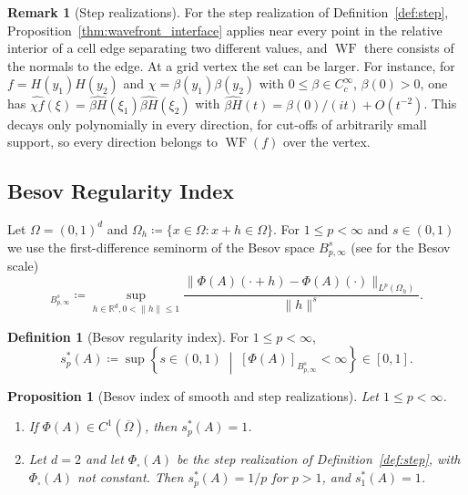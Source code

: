 \documentclass[11pt,a4paper,reqno]{amsart}
\newtheorem{proposition}[theorem]{Proposition}
\theoremstyle{definition}
\newtheorem{definition}[theorem]{Definition}
\newtheorem{remark}[theorem]{Remark}
\numberwithin{equation}{section}
\newcommand{\R}{\mathbb{R}}
\newcommand{\WF}{\operatorname{WF}}
\begin{document}
\begin{remark}[Step realizations]
For the step realization of Definition~\ref{def:step}, Proposition~\ref{thm:wavefront_interface} applies near every point in the relative interior of a cell edge separating two different values, and $\WF$ there consists of the normals to the edge. At a grid vertex the set can be larger. For instance, for $f = H(y_1)H(y_2)$ and $\chi = \beta(y_1)\beta(y_2)$ with $0 \le \beta \in C_c^\infty$, $\beta(0) > 0$, one has $\widehat{\chi f}(\xi) = \widehat{\beta H}(\xi_1)\widehat{\beta H}(\xi_2)$ with $\widehat{\beta H}(t) = \beta(0)/(it) + O(t^{-2})$. This decays only polynomially in every direction, for cut-offs of arbitrarily small support, so every direction belongs to $\WF(f)$ over the vertex.
\end{remark}

\subsection{Besov Regularity Index}
Let $\Omega = (0,1)^d$ and $\Omega_h \coloneqq \{x \in \Omega : x + h \in \Omega\}$. For $1 \le p < \infty$ and $s \in (0,1)$ we use the first-difference seminorm of the Besov space $B^s_{p,\infty}$ (see \cite{triebel1983theory} for the Besov scale)
\begin{equation}
    [\Phi(A)]_{B^s_{p,\infty}} \coloneqq \sup_{h \in \R^d, 0 < \|h\| \le 1} \frac{\|\Phi(A)(\cdot + h) - \Phi(A)(\cdot)\|_{L^p(\Omega_h)}}{\|h\|^s}.
\end{equation}

\begin{definition}[Besov regularity index]
For $1 \le p < \infty$,
\begin{equation}
    s^*_p(A) \coloneqq \sup \left\{ s \in (0, 1) \;\middle|\; [\Phi(A)]_{B^s_{p,\infty}} < \infty \right\} \in [0,1].
\end{equation}
\end{definition}

\begin{proposition}[Besov index of smooth and step realizations]
\label{prop:besov}
Let $1 \le p < \infty$.
\begin{enumerate}[label=(\alph*)]
    \item If $\Phi(A) \in C^1(\overline{\Omega})$, then $s^*_p(A) = 1$.
    \item Let $d = 2$ and let $\Phi_\square(A)$ be the step realization of Definition~\ref{def:step}, with $\Phi_\square(A)$ not constant. Then $s^*_p(A) = 1/p$ for $p > 1$, and $s^*_1(A) = 1$.
\end{enumerate}
\end{proposition}
\end{document}
